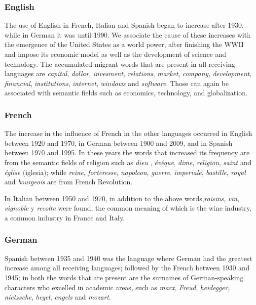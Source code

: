 \documentclass[10pt,letterpaper]{article} %
\begin{document}
\subsubsection*{English} %

The use of English in French, Italian and Spanish began to increase after 1930, while in German it was until 1990. We associate the cause of these increases with the emergence of the United States as a world power, after finishing the WWII and  impose its economic model as well as the development of science and technology. The accumulated migrant words that are present in all receiving  languages ​are \textit{capital}, \textit{dollar}, \textit{invesment}, \textit{relations}, \textit{market}, \textit{company}, \textit{development}, \textit{financial},  \textit{institutions}, \textit{internet}, \textit{windows} and \textit{software}. Those can again be associated with semantic fields such as economics, technology, and globalization.

\subsubsection*{French} %

The increase in the influence of French in the other languages occurred in English between 1920 and 1970, in German between 1900 and 2009, and in Spanish between 1970 and 1995. In these years the words that increased its frequency are from the semantic fields of religion such as \textit{dieu} , \textit{évêque}, \textit{dime}, \textit{religion}, \textit{saint} and \textit{église} (iglesia); while \textit{reine}, \textit{forteresse}, \textit{napoleon}, \textit{guerre}, \textit{imperiale}, \textit{bastille}, \textit{royal} and \textit{bourgeois} are from French Revolution.

In Italian between 1950 and 1970, in addition to the above words,\textit{raisins}, \textit{vin}, \textit{vignoble} y \textit{recolte} were found, the common meaning of which is the wine industry, a common industry in France and Italy.

\subsubsection*{German} %

Spanish between 1935 and 1940 was the language where German had the greatest increase among all receiving languages; followed by the French between 1930 and 1945; in both  the words that are present are the surnames of German-speaking characters who excelled in academic areas, such as \textit{marx}, \textit{Freud}, \textit{heidegger}, \textit{nietzsche}, \textit{hegel}, \textit{engels} and \textit{mozart}.
\end{document}
